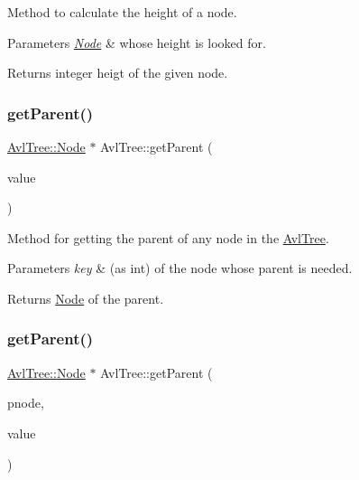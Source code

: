 Method to calculate the height of a node. 
\begin{DoxyParams}{Parameters}
{\em \mbox{\hyperlink{struct_avl_tree_1_1_node}{Node}}} & whose height is looked for. \\
\hline
\end{DoxyParams}
\begin{DoxyReturn}{Returns}
integer heigt of the given node. 
\end{DoxyReturn}
\mbox{\label{class_avl_tree_ab48adaa9a4e224e2aaeb9c3f7732f5ba}} 
\subsubsection{\texorpdfstring{get\+Parent()}{getParent()}\hspace{0.1cm}{\footnotesize\ttfamily [1/2]}}
{\footnotesize\ttfamily \mbox{\hyperlink{struct_avl_tree_1_1_node}{Avl\+Tree\+::\+Node}} $\ast$ Avl\+Tree\+::get\+Parent (\begin{DoxyParamCaption}\item[{int}]{value }\end{DoxyParamCaption})}

Method for getting the parent of any node in the \mbox{\hyperlink{class_avl_tree}{Avl\+Tree}}. 
\begin{DoxyParams}{Parameters}
{\em key} & (as int) of the node whose parent is needed. \\
\hline
\end{DoxyParams}
\begin{DoxyReturn}{Returns}
\mbox{\hyperlink{struct_avl_tree_1_1_node}{Node}} of the parent. 
\end{DoxyReturn}
\mbox{\label{class_avl_tree_af64d3251ddc4687a6431c444896d0676}} 
\subsubsection{\texorpdfstring{get\+Parent()}{getParent()}\hspace{0.1cm}{\footnotesize\ttfamily [2/2]}}
{\footnotesize\ttfamily \mbox{\hyperlink{struct_avl_tree_1_1_node}{Avl\+Tree\+::\+Node}} $\ast$ Avl\+Tree\+::get\+Parent (\begin{DoxyParamCaption}\item[{\mbox{\hyperlink{struct_avl_tree_1_1_node}{Avl\+Tree\+::\+Node}} $\ast$}]{pnode,  }\item[{int}]{value }\end{DoxyParamCaption})}

